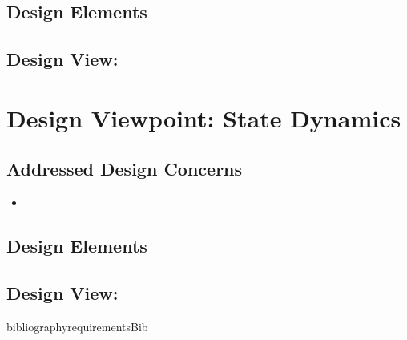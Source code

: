 \documentclass[onecolumn, draftclsnofoot,10pt, compsoc]{IEEEtran}
\begin{document}
    \subsection{Design Elements}

    \subsection{Design View: }


\section{Design Viewpoint: State Dynamics}
    \subsection{Addressed Design Concerns}
        \begin{itemize}
            \item
        \end{itemize}

    \subsection{Design Elements}

    \subsection{Design View: }
bibliography{requirementsBib} 
%
\end{document}
